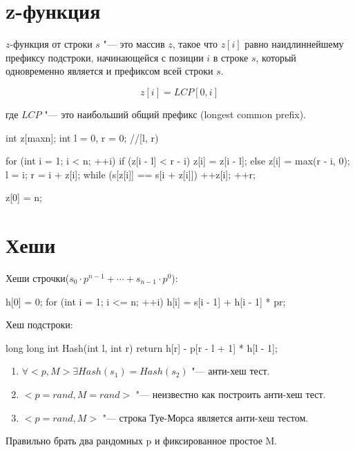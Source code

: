 \section{z-функция}

\begin{Def}
$z$-функция от строки $s$ "--- это массив $z$, такое что $z[i]$ равно наидлиннейшему префиксу подстроки, начинающейся с позиции $i$ в строке $s$,
 который одновременно является и префиксом всей строки $s$.

$$z[i] = LCP[0,i]$$

где $LCP$ "--- это наибольший общий префикс (longest common prefix).
\end{Def}

\begin{cppcode}
int z[maxn];
int l = 0, r = 0; //[l, r)

for (int i = 1; i < n; ++i) {
    if (z[i - l] < r - i) {
        z[i] = z[i - l];
    } else {
        z[i] = max(r - i, 0);
        l = i;
        r = i + z[i];
        while (s[z[i]] == s[i + z[i]]) {
            ++z[i];
            ++r;
        }
    }
}

z[0] = n;
\end{cppcode}

\section{Хеши} 

Хеши строчки($s_0\cdot p^{n - 1} + \cdots + s_{n - 1} \cdot p^{0}$):

\begin{cppcode}
h[0] = 0;
for (int i = 1; i <= n; ++i) {
    h[i] = s[i - 1] + h[i - 1] * pr;
}
\end{cppcode}


Хеш подстроки:
\begin{cppcode}
long long int Hash(int l, int r) {
    return h[r] - p[r - l + 1] * h[l - 1];
}
\end{cppcode}

\begin{enumerate}
\item $\forall <p, M> \exists Hash(s_1) = Hash(s_2)$ "--- анти-хеш тест.
\item $<p = rand, M = rand>$ "--- неизвестно как построить анти-хеш тест.
\item $<p = rand, M>$ "--- строка Туе-Морса является анти-хеш тестом.
\end{enumerate}

Правильно брать два рандомных p и фиксированное простое M.

